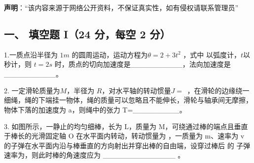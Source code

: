 
\textbf{声明}：“该内容来源于网络公开资料，不保证真实性，如有侵权请联系管理员”

\subsection{一、 填空题 I（24 分，每空 2 分）}
1.一质点沿半径为 $1m$ 的圆周运动，运动方程为$\theta=2+3t^2$ ，式中 以弧度计，$t$以秒计，则 $t=2s$ 时，质点的切向加速度是__________，法向加速度是__________。

2. 一定滑轮质量为$M$，半径为 $R$，对水平轴的转动惯量$J=\frac{}{}$ ，在滑轮的边缘绕一细绳，绳的下端挂一物体，绳的质量可以忽略且不能伸长，滑轮与轴承间无摩擦，物体下落的加速度为 a，则绳中的张力 T=_________。

3. 如图所示，一静止的均匀细棒，长为 L，质量为 M，可绕通过棒的端点且垂直于棒长的光滑固定轴 O 在水平面内转动，转动惯量为 ，一质量为 m、速率为 v 的子弹在水平面内沿与棒垂直的方向射出并穿出棒的自由端，设穿过棒后 的 子弹速率为，则此时棒的角速度应为 ______________ 。